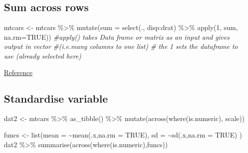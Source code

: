 \documentclass[
]{article}
\newenvironment{Shaded}{\begin{snugshade}}{\end{snugshade}}
\newcommand{\AttributeTok}[1]{\textcolor[rgb]{0.77,0.63,0.00}{#1}}
\newcommand{\CommentTok}[1]{\textcolor[rgb]{0.56,0.35,0.01}{\textit{#1}}}
\newcommand{\ConstantTok}[1]{\textcolor[rgb]{0.00,0.00,0.00}{#1}}
\newcommand{\DecValTok}[1]{\textcolor[rgb]{0.00,0.00,0.81}{#1}}
\newcommand{\FunctionTok}[1]{\textcolor[rgb]{0.00,0.00,0.00}{#1}}
\newcommand{\NormalTok}[1]{#1}
\newcommand{\OtherTok}[1]{\textcolor[rgb]{0.56,0.35,0.01}{#1}}
\newcommand{\SpecialCharTok}[1]{\textcolor[rgb]{0.00,0.00,0.00}{#1}}
\begin{document}
\hypertarget{sum-across-rows}{%
\subsection{Sum across rows}\label{sum-across-rows}}

\begin{Shaded}
\begin{Highlighting}[]
\NormalTok{mtcars }\OtherTok{\textless{}{-}}\NormalTok{ mtcars }\SpecialCharTok{\%\textgreater{}\%}  \FunctionTok{mutate}\NormalTok{(}\AttributeTok{sum =} \FunctionTok{select}\NormalTok{(., disp}\SpecialCharTok{:}\NormalTok{drat) }\SpecialCharTok{\%\textgreater{}\%} 
\FunctionTok{apply}\NormalTok{(}\DecValTok{1}\NormalTok{, sum, }\AttributeTok{na.rm=}\ConstantTok{TRUE}\NormalTok{))}
\CommentTok{\#apply() takes Data frame or matrix as an input and gives output in vector }
\CommentTok{\#(i.e.many columns to one list)}
\CommentTok{\# the \textquotesingle{}1\textquotesingle{} sets the dataframe to use (already selected here)}
\end{Highlighting}
\end{Shaded}

\href{https://stackoverflow.com/questions/28873057/sum-across-multiple-columns-with-dplyr}{Reference}

\hypertarget{standardise-variable}{%
\subsection{Standardise variable}\label{standardise-variable}}

\begin{Shaded}
\begin{Highlighting}[]
\NormalTok{dat2 }\OtherTok{\textless{}{-}}\NormalTok{ mtcars }\SpecialCharTok{\%\textgreater{}\%}
    \FunctionTok{as\_tibble}\NormalTok{() }\SpecialCharTok{\%\textgreater{}\%}
    \FunctionTok{mutate}\NormalTok{(}\FunctionTok{across}\NormalTok{(}\FunctionTok{where}\NormalTok{(is.numeric), scale))}

\NormalTok{funcs }\OtherTok{\textless{}{-}} \FunctionTok{list}\NormalTok{(}\AttributeTok{mean =} \SpecialCharTok{\textasciitilde{}}\FunctionTok{mean}\NormalTok{(.x,}\AttributeTok{na.rm =} \ConstantTok{TRUE}\NormalTok{), }
  \AttributeTok{sd =} \SpecialCharTok{\textasciitilde{}}\FunctionTok{sd}\NormalTok{(.x,}\AttributeTok{na.rm =} \ConstantTok{TRUE}\NormalTok{)}
\NormalTok{)}
\NormalTok{dat2 }\SpecialCharTok{\%\textgreater{}\%} \FunctionTok{summarise}\NormalTok{(}\FunctionTok{across}\NormalTok{(}\FunctionTok{where}\NormalTok{(is.numeric),funcs))}
\end{Highlighting}
\end{Shaded}
\end{document}
